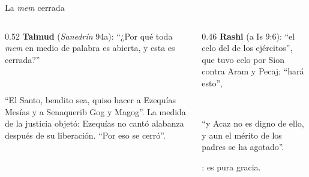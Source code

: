 \begin{frame}{La \emph{mem} cerrada}
\begin{columns}[t,onlytextwidth]
\begin{column}{0.52\textwidth}\small
\textbf{Talmud} (\emph{Sanedrín} 94a): ``¿Por qué toda \emph{mem} en medio de palabra es abierta, y esta es cerrada?''
\begin{center}\\ \end{center}
``El Santo, bendito sea, quiso hacer a Ezequías Mesías y a Senaquerib Gog y Magog''. La medida de la justicia objetó: Ezequías no cantó alabanza después de su liberación. ``Por eso se cerró''.
\end{column}
\begin{column}{0.46\textwidth}\small
\textbf{Rashi} (a Is 9:6): ``el celo del \SENOR{} de los ejércitos'', que tuvo celo por Sion contra Aram y Pecaj; ``hará esto'',
\begin{center}\\ \end{center}
``y Acaz no es digno de ello, y aun el mérito de los padres se ha agotado''.\par\smallskip
{}: es pura gracia.
\end{column}
\end{columns}\par\smallskip
{}
\end{frame}

